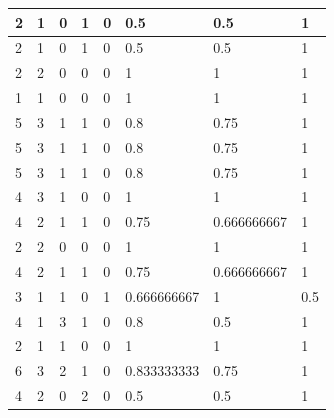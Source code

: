 \begin{small}
\begin{longtable}{|l|l|l|l|l|l|l|l|}
2  & 1           & 0           & 1           & 0           & 0.5               & 0.5                & 1               \\ \hline
2  & 1           & 0           & 1           & 0           & 0.5               & 0.5                & 1               \\ \hline
2  & 2           & 0           & 0           & 0           & 1                 & 1                  & 1               \\ \hline
1  & 1           & 0           & 0           & 0           & 1                 & 1                  & 1               \\ \hline
5  & 3           & 1           & 1           & 0           & 0.8               & 0.75               & 1               \\ \hline
5  & 3           & 1           & 1           & 0           & 0.8               & 0.75               & 1               \\ \hline
5  & 3           & 1           & 1           & 0           & 0.8               & 0.75               & 1               \\ \hline
4  & 3           & 1           & 0           & 0           & 1                 & 1                  & 1               \\ \hline
4  & 2           & 1           & 1           & 0           & 0.75              & 0.666666667        & 1               \\ \hline
2  & 2           & 0           & 0           & 0           & 1                 & 1                  & 1               \\ \hline
4  & 2           & 1           & 1           & 0           & 0.75              & 0.666666667        & 1               \\ \hline
3  & 1           & 1           & 0           & 1           & 0.666666667       & 1                  & 0.5             \\ \hline
4  & 1           & 3           & 1           & 0           & 0.8               & 0.5                & 1               \\ \hline
2  & 1           & 1           & 0           & 0           & 1                 & 1                  & 1               \\ \hline
6  & 3           & 2           & 1           & 0           & 0.833333333       & 0.75               & 1               \\ \hline
4  & 2           & 0           & 2           & 0           & 0.5               & 0.5                & 1               \\ \hline

\end{longtable}
\end{small}
